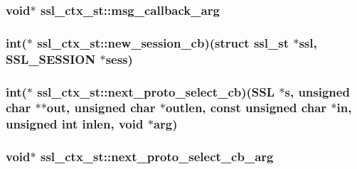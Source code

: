 \hypertarget{structssl__ctx__st_ad1aba043a97ea40fcb8a39e65698f8c0}{
\subsubsection[{msg\-\_\-callback\-\_\-arg}]{\setlength{\rightskip}{0pt plus 5cm}void$\ast$ ssl\-\_\-ctx\-\_\-st\-::msg\-\_\-callback\-\_\-arg}}\label{structssl__ctx__st_ad1aba043a97ea40fcb8a39e65698f8c0}
\hypertarget{structssl__ctx__st_ad25375ee230e8a9dafda44d9c9bcb102}{
\subsubsection[{new\-\_\-session\-\_\-cb}]{\setlength{\rightskip}{0pt plus 5cm}int($\ast$ ssl\-\_\-ctx\-\_\-st\-::new\-\_\-session\-\_\-cb)(struct {\bf ssl\-\_\-st} $\ast$ssl, {\bf S\-S\-L\-\_\-\-S\-E\-S\-S\-I\-O\-N} $\ast$sess)}}\label{structssl__ctx__st_ad25375ee230e8a9dafda44d9c9bcb102}
\hypertarget{structssl__ctx__st_a84930015e1769305baec3fa3e122d6b6}{
\subsubsection[{next\-\_\-proto\-\_\-select\-\_\-cb}]{\setlength{\rightskip}{0pt plus 5cm}int($\ast$ ssl\-\_\-ctx\-\_\-st\-::next\-\_\-proto\-\_\-select\-\_\-cb)(S\-S\-L $\ast$s, unsigned char $\ast$$\ast$out, unsigned char $\ast$outlen, const unsigned char $\ast$in, unsigned int inlen, void $\ast$arg)}}\label{structssl__ctx__st_a84930015e1769305baec3fa3e122d6b6}
\hypertarget{structssl__ctx__st_ac7f01a164bb2f9ded179bd27940926bf}{
\subsubsection[{next\-\_\-proto\-\_\-select\-\_\-cb\-\_\-arg}]{\setlength{\rightskip}{0pt plus 5cm}void$\ast$ ssl\-\_\-ctx\-\_\-st\-::next\-\_\-proto\-\_\-select\-\_\-cb\-\_\-arg}}\label{structssl__ctx__st_ac7f01a164bb2f9ded179bd27940926bf}
